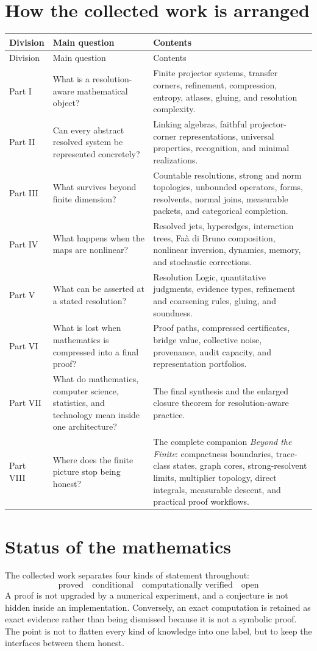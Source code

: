 \documentclass[11pt]{article}
\begin{document}
\section*{How the collected work is arranged}
\begin{longtable}{L{1.05in}L{2.25in}L{3.65in}}
\toprule
Division & Main question & Contents\\
\midrule
\endfirsthead
\toprule
Division & Main question & Contents\\
\midrule
\endhead
Part I & What is a resolution-aware mathematical object? & Finite projector systems, transfer corners, refinement, compression, entropy, atlases, gluing, and resolution complexity.\\
Part II & Can every abstract resolved system be represented concretely? & Linking algebras, faithful projector-corner representations, universal properties, recognition, and minimal realizations.\\
Part III & What survives beyond finite dimension? & Countable resolutions, strong and norm topologies, unbounded operators, forms, resolvents, normal joins, measurable packets, and categorical completion.\\
Part IV & What happens when the maps are nonlinear? & Resolved jets, hyperedges, interaction trees, Fa\`a di Bruno composition, nonlinear inversion, dynamics, memory, and stochastic corrections.\\
Part V & What can be asserted at a stated resolution? & Resolution Logic, quantitative judgments, evidence types, refinement and coarsening rules, gluing, and soundness.\\
Part VI & What is lost when mathematics is compressed into a final proof? & Proof paths, compressed certificates, bridge value, collective noise, provenance, audit capacity, and representation portfolios.\\
Part VII & What do mathematics, computer science, statistics, and technology mean inside one architecture? & The final synthesis and the enlarged closure theorem for resolution-aware practice.\\
Part VIII & Where does the finite picture stop being honest? & The complete companion \emph{Beyond the Finite}: compactness boundaries, trace-class states, graph cores, strong-resolvent limits, multiplier topology, direct integrals, measurable descent, and practical proof workflows.\\
\bottomrule
\end{longtable}

\section*{Status of the mathematics}
The collected work separates four kinds of statement throughout:
\[
\boxed{
\text{proved}
\quad\text{conditional}
\quad\text{computationally verified}
\quad\text{open}
}
\]
A proof is not upgraded by a numerical experiment, and a conjecture is not hidden inside an implementation.  Conversely, an exact computation is retained as exact evidence rather than being dismissed because it is not a symbolic proof.  The point is not to flatten every kind of knowledge into one label, but to keep the interfaces between them honest.
\end{document}
